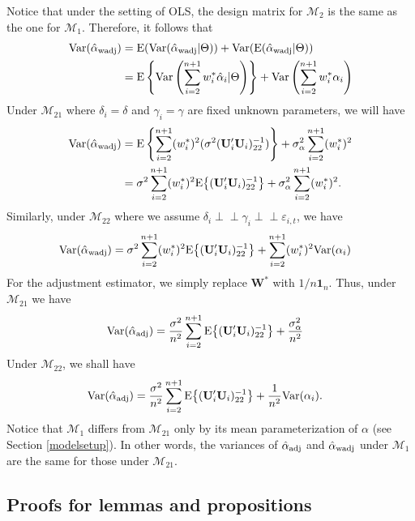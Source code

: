 \documentclass[11pt]{article}
\def\mbf#1{\mathbf{#1}} %
\newcommand{\indep}{\perp \!\!\! \perp } %
\def\mrm#1{\mathrm{#1}} %
\def\mc#1{\mathcal{#1}} %
\def\E#1{\mathrm{E}(#1)} %
\def\var#1{\mathrm{Var}(#1)} %
\theoremstyle{definition}
\begin{document}
Notice that under the setting of OLS, the design matrix for $\mc{M}_2$ is the same as the one for $\mc{M}_1$. Therefore, it follows that
  \begin{align*}
  \var{\hat{\alpha}_{\rm wadj}} 
  &= \E{\var{\hat{\alpha}_{\rm wadj}|\Theta}} + \var{\E{\hat{\alpha}_{\rm wadj}|\Theta}} \\
  &=\mrm{E} \left\{\mrm{Var}\left(\sum_{i=2}^{n+1} w_i^*\hat{\alpha}_i|\Theta\right)\right\} +\mrm{Var}\left(\sum_{i=2}^{n+1} w_i^*\alpha_i\right) 
\end{align*}
Under $\mc{M}_{21}$ where $\delta_i=\delta$ and $\gamma_i=\gamma$ are fixed unknown parameters,  we will have
  \begin{align}
  \var{\hat{\alpha}_{\rm wadj}} 
  &= \mrm{E} \left\{\sum_{i=2}^{n+1}(w_i^*)^2(\sigma^2(\mbf{U}'_i\mbf{U}_i)^{-1}_{22})\right\} +\sigma^2_{\alpha}\sum_{i=2}^{n+1}(w_i^*)^2  \nonumber\\
  &= \sigma^2\sum_{i=2}^{n+1}(w_i^*)^2\mrm{E}\big\{(\mbf{U}'_i\mbf{U}_i)^{-1}_{22}\big\}+\sigma^2_{\alpha}\sum_{i=2}^{n+1}(w_i^*)^2.\label{equation6}
\end{align}
Similarly, under $\mc{M}_{22}$ where we assume $\delta_i \indep \gamma_i \indep \varepsilon_{i,t}$, we have
 \begin{align*}
  \var{\hat{\alpha}_{\rm wadj}} 
  &= \sigma^2\sum_{i=2}^{n+1}(w_i^*)^2\mrm{E}\big\{(\mbf{U}'_i\mbf{U}_i)^{-1}_{22}\big\}
  + \sum_{i=2}^{n+1} (w_i^*)^2 \var{\alpha_i}
\end{align*}
For the adjustment estimator, we simply replace $\mbf{W}^*$ with $1/n\mbf{1}_n$. Thus, under $\mc{M}_{21}$ we have 
 \begin{align*}
  \var{\hat{\alpha}_{\rm adj}} 
  &=\frac{\sigma^2}{n^2}\sum_{i=2}^{n+1}\mrm{E}\big\{(\mbf{U}'_i\mbf{U}_i)^{-1}_{22}\big\}+\frac{\sigma^2_{\alpha}}{n^2}
\end{align*}
Under $\mc{M}_{22}$, we shall have
 \begin{align*}
  \var{\hat{\alpha}_{\rm adj}} 
  &=\frac{\sigma^2}{n^2}\sum_{i=2}^{n+1}\mrm{E}\big\{(\mbf{U}'_i\mbf{U}_i)^{-1}_{22}\big\}+\frac{1}{n^2}\var{\alpha_i}.
\end{align*}
Notice that $\mc{M}_{1}$ differs from $\mc{M}_{21}$ only by its mean parameterization of $\alpha$ (see Section \ref{modelsetup}). In other words, the variances of $\hat{\alpha}_{\rm adj}$ and $\hat{\alpha}_{\rm wadj}$ under $\mc{M}_1$ are the same for those under $\mc{M}_{21}$.

\subsection{Proofs for lemmas and propositions}
\end{document}
